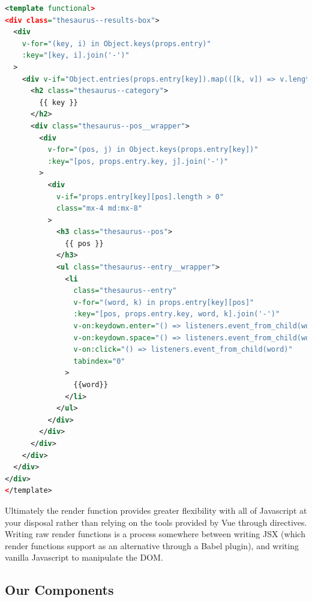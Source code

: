 \documentclass[11pt, twoside, reqno]{book}
\begin{document}
\begin{lstlisting}[language=XML]
<template functional>
<div class="thesaurus--results-box">
  <div 
    v-for="(key, i) in Object.keys(props.entry)" 
    :key="[key, i].join('-')"
  >
    <div v-if="Object.entries(props.entry[key]).map(([k, v]) => v.length > 0).reduce((a, c) => (a || c))">
      <h2 class="thesaurus--category">
        {{ key }}
      </h2>
      <div class="thesaurus--pos__wrapper">
        <div 
          v-for="(pos, j) in Object.keys(props.entry[key])" 
          :key="[pos, props.entry.key, j].join('-')"
        >
          <div 
            v-if="props.entry[key][pos].length > 0" 
            class="mx-4 md:mx-8"
          >
            <h3 class="thesaurus--pos">
              {{ pos }}
            </h3>
            <ul class="thesaurus--entry__wrapper">
              <li 
                class="thesaurus--entry" 
                v-for="(word, k) in props.entry[key][pos]" 
                :key="[pos, props.entry.key, word, k].join('-')" 
                v-on:keydown.enter="() => listeners.event_from_child(word)" 
                v-on:keydown.space="() => listeners.event_from_child(word)" 
                v-on:click="() => listeners.event_from_child(word)" 
                tabindex="0"
              >
                {{word}}
              </li>
            </ul>
          </div>
        </div>
      </div>
    </div>
  </div>
</div>
</template>
\end{lstlisting}

Ultimately the render function provides greater flexibility with all of Javascript at your disposal rather than relying on the tools provided by Vue through directives. Writing raw render functions is a process somewhere between writing JSX (which render functions support as an alternative through a Babel plugin), and writing vanilla Javascript to manipulate the DOM.

\subsection{Our Components}
\end{document}
